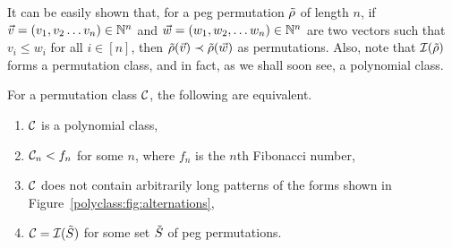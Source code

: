     It can be easily shown that, for a peg permutation $\tilde{\rho}$ of length $n$, if
    $\vec v = (v_1, v_2 \dots v_n) \in \mathbb{N}^n$ and $\vec w = (w_1, w_2, \dots
    w_n) \in \mathbb{N}^n$ are two vectors such that $v_i \leq w_i$ for all $i \in [n]$,
    then $\tilde{\rho}(\vec v) \prec \tilde{\rho}(\vec w)$ as permutations. Also, note that
    $\mathcal{I}(\tilde{\rho})$ forms a permutation class, and in fact, as we shall soon see, a
    polynomial class. 

    \begin{theorem} \label{polyclass:thm:tfae}
      For a permutation class $\mathcal{C}$, the following are equivalent. 
      \begin{enumerate}[1)]
        \item $\mathcal{C}$ is a polynomial class,
        \item $\mathcal{C}_n < f_n$ for some $n$, where $f_n$ is the $n$th Fibonacci
        number,
        \item $\mathcal{C}$ does not contain arbitrarily long patterns of the forms
        shown in Figure~\ref{polyclass:fig:alternations},
        \item $\mathcal{C} = \mathcal{I}(\tilde{S})$ for some set $\tilde{S}$ of peg permutations. 
      \end{enumerate}
    \end{theorem}

